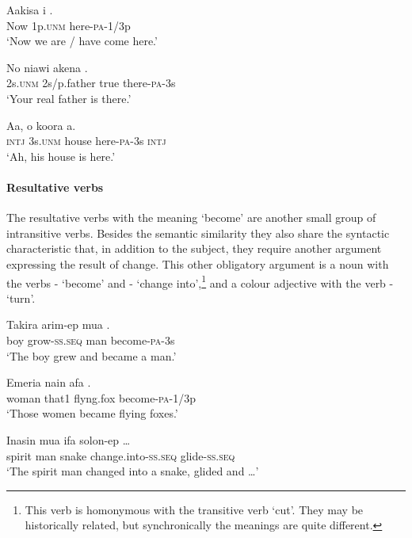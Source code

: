 \ea%
\label{ex:x1271}
\gll Aakisa i . \\
Now 1p.\textsc{unm} here-\textsc{pa}-1/3p \\
\glt`Now we are / have come here.'
\z

\ea%
\label{ex:x1272}
\gll No niawi akena . \\
2s.\textsc{unm} 2s/p.father true there-\textsc{pa}-3s\\
\glt`Your real father is there.'
\z

\ea%
\label{ex:x1276}
\gll Aa, o koora  a. \\
\textsc{intj} 3s.\textsc{unm} house here-\textsc{pa}-3s \textsc{intj}\\
\glt`Ah, his house is here.'
\z

\paragraph[Resultative verbs]{Resultative verbs}
{}
The resultative verbs with the meaning `become' are another small group of intransitive verbs. Besides the semantic similarity they also share the syntactic characteristic that, in addition to the subject, they require another argument expressing the result of change. This other obligatory argument is a noun with the verbs - `become' and - `change into',\footnote{This verb is homonymous with the transitive verb  `cut'. They may be historically related, but synchronically the meanings are quite different.} and a colour adjective with the verb - `turn'. 

\ea%
\label{ex:x276}
\gll Takira arim-ep mua . \\
boy grow-\textsc{ss}.\textsc{seq} man become-\textsc{pa}-3s \\
\glt`The boy grew and became a man.'
\z

\ea%
\label{ex:x277}
\gll Emeria nain afa . \\
woman that1 flyng.fox become-\textsc{pa}-1/3p \\
\glt`Those women became flying foxes.'
\z

\ea%
\label{ex:x278}
\gll Inasin mua ifa  solon-ep {\dots} \\
spirit man snake change.into-\textsc{ss}.\textsc{seq} glide-\textsc{ss}.\textsc{seq} \\
\glt`The spirit man changed into a snake, glided and {\dots}'
\z

